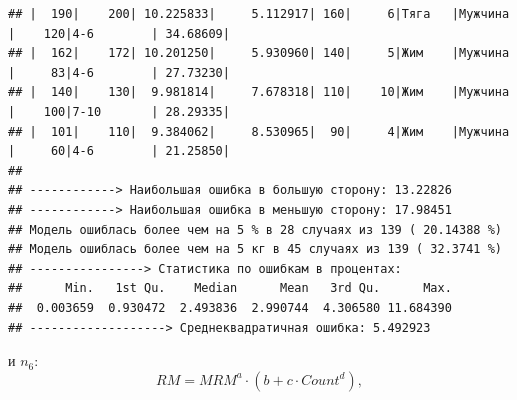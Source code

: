 \documentclass[
]{article}
\begin{document}
\begin{verbatim}
## |  190|    200| 10.225833|     5.112917| 160|     6|Тяга   |Мужчина |    120|4-6        | 34.68609|
## |  162|    172| 10.201250|     5.930960| 140|     5|Жим    |Мужчина |     83|4-6        | 27.73230|
## |  140|    130|  9.981814|     7.678318| 110|    10|Жим    |Мужчина |    100|7-10       | 28.29335|
## |  101|    110|  9.384062|     8.530965|  90|     4|Жим    |Мужчина |     60|4-6        | 21.25850|
## 
## ------------> Наибольшая ошибка в большую сторону: 13.22826 
## ------------> Наибольшая ошибка в меньшую сторону: 17.98451 
## Модель ошиблась более чем на 5 % в 28 случаях из 139 ( 20.14388 %)
## Модель ошиблась более чем на 5 кг в 45 случаях из 139 ( 32.3741 %)
## ----------------> Статистика по ошибкам в процентах:
##      Min.   1st Qu.    Median      Mean   3rd Qu.      Max. 
##  0.003659  0.930472  2.493836  2.990744  4.306580 11.684390 
## -------------------> Среднеквадратичная ошибка: 5.492923
\end{verbatim}

и \(n_6\): \[RM=MRM^a \cdot \left(b+c \cdot Count^d \right),\]
\end{document}
